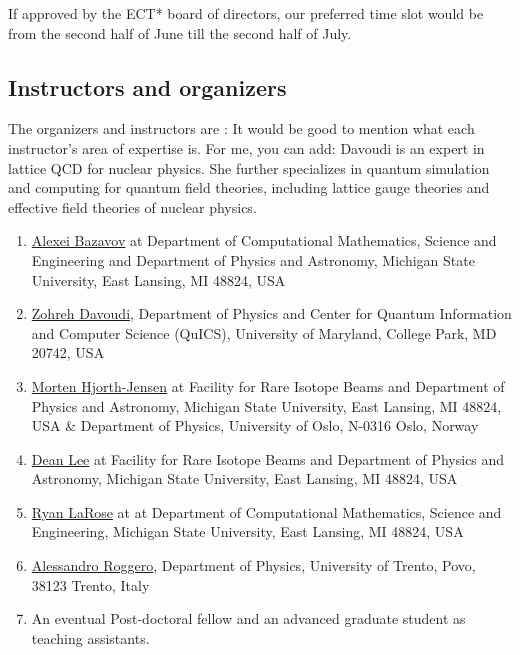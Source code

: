 \documentclass[twocolumn,superscriptaddress,amsmath,amssymb,
aps,floatfix]{revtex4-2}
\newcommand{\zd}[1]{{\color{purple}{\bf ZD}: #1}}
\begin{document}
If approved by the ECT* board of directors, our preferred time slot
would be from the second half of June till the second half of July.

    \subsection{Instructors and organizers}\label{instructors-and-organizers}

The organizers and instructors are \zd{It would be good to mention what each instructor's area of expertise is. For me, you can add: Davoudi is an expert in lattice QCD for nuclear physics. She further specializes in quantum simulation and computing for quantum field theories, including lattice gauge theories and effective field theories of nuclear physics.}


\begin{enumerate}
\item 
\href{https://directory.natsci.msu.edu/Directory/Profiles/Person/101033}{Alexei
Bazavov} at Department of Computational Mathematics, Science and
Engineering and Department of Physics and Astronomy, Michigan State
University, East Lansing, MI 48824, USA
\item
  \href{https://umdphysics.umd.edu/people/faculty/current/item/927-davoudi.html}{Zohreh
  Davoudi}, Department of Physics and Center for Quantum Information and Computer Science (QuICS), University of Maryland, College Park,
  MD 20742, USA
\item
  \href{http://mhjgit.github.io/info/doc/web/}{Morten Hjorth-Jensen} at
  Facility for Rare Isotope Beams and Department of Physics and
  Astronomy, Michigan State University, East Lansing, MI 48824, USA \&
  Department of Physics, University of Oslo, N-0316 Oslo, Norway
\item
  \href{https://frib.msu.edu/for-students/faculty/lee-profile}{Dean Lee}
  at Facility for Rare Isotope Beams and Department of Physics and
  Astronomy, Michigan State University, East Lansing, MI 48824, USA
\item
  \href{https://www.ryanlarose.com/}{Ryan LaRose} at at Department of
  Computational Mathematics, Science and Engineering, Michigan State
  University, East Lansing, MI 48824, USA
\item
  \href{https://webapps.unitn.it/du/en/Persona/PER0016084/Didattica}{Alessandro
  Roggero}, Department of Physics, University of Trento, Povo, 38123
  Trento, Italy
\item
  An eventual Post-doctoral fellow and an advanced graduate student as
  teaching assistants.
\end{enumerate}
\end{document}
